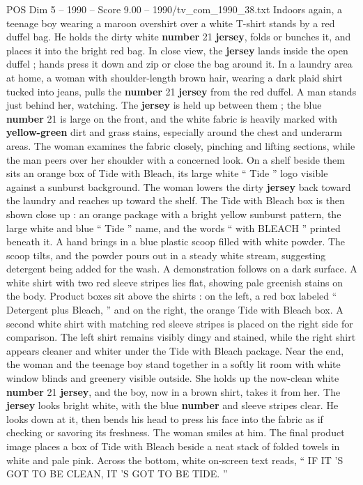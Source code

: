 \begin{textsample}{POS Dim 5 – 1990 – Score 9.00 – 1990/tv\_com\_1990\_38.txt}
Indoors again, a teenage boy wearing a maroon overshirt over a white T-shirt stands by a red duffel bag.
He holds the dirty white \textbf{number} 21 \textbf{jersey}, folds or bunches it, and places it into the bright red bag.
In close view, the \textbf{jersey} lands inside the open duffel ; hands press it down and zip or close the bag around it.
In a laundry area at home, a woman with shoulder-length brown hair, wearing a dark plaid shirt tucked into jeans, pulls the \textbf{number} 21 \textbf{jersey} from the red duffel.
A man stands just behind her, watching.
The \textbf{jersey} is held up between them ; the blue \textbf{number} 21 is large on the front, and the white fabric is heavily marked with \textbf{yellow-green} dirt and grass stains, especially around the chest and underarm areas.
The woman examines the fabric closely, pinching and lifting sections, while the man peers over her shoulder with a concerned look.
On a shelf beside them sits an orange box of Tide with Bleach, its large white “ Tide ” logo visible against a sunburst background.
The woman lowers the dirty \textbf{jersey} back toward the laundry and reaches up toward the shelf.
The Tide with Bleach box is then shown close up : an orange package with a bright yellow sunburst pattern, the large white and blue “ Tide ” name, and the words “ with BLEACH ” printed beneath it.
A hand brings in a blue plastic scoop filled with white powder.
The scoop tilts, and the powder pours out in a steady white stream, suggesting detergent being added for the wash.
A demonstration follows on a dark surface.
A white shirt with two red sleeve stripes lies flat, showing pale greenish stains on the body.
Product boxes sit above the shirts : on the left, a red box labeled “ Detergent plus Bleach, ” and on the right, the orange Tide with Bleach box.
A second white shirt with matching red sleeve stripes is placed on the right side for comparison.
The left shirt remains visibly dingy and stained, while the right shirt appears cleaner and whiter under the Tide with Bleach package.
Near the end, the woman and the teenage boy stand together in a softly lit room with white window blinds and greenery visible outside.
She holds up the now-clean white \textbf{number} 21 \textbf{jersey}, and the boy, now in a brown shirt, takes it from her.
The \textbf{jersey} looks bright white, with the blue \textbf{number} and sleeve stripes clear.
He looks down at it, then bends his head to press his face into the fabric as if checking or savoring its freshness.
The woman smiles at him.
The final product image places a box of Tide with Bleach beside a neat stack of folded towels in white and pale pink.
Across the bottom, white on-screen text reads, “ IF IT ’S GOT TO BE CLEAN, IT ’S GOT TO BE TIDE. ”

\end{textsample}
